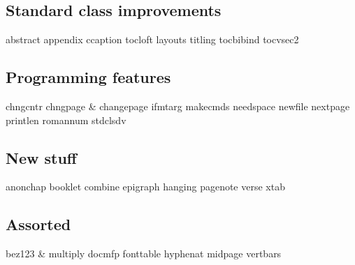 \documentclass{ltugboat}
\begin{document}
\subsection{Standard class improvements}

 abstract
 appendix
 ccaption
 tocloft
 layouts
 titling
 tocbibind
 tocvsec2

\subsection{Programming features}

 chngcntr
 chngpage \& changepage
 ifmtarg
 makecmds
 needspace
 newfile
 nextpage
 printlen
 romannum
 stdclsdv

\subsection{New stuff}

 anonchap
 booklet
 combine
 epigraph
 hanging
 pagenote
 verse
 xtab
 
\subsection{Assorted}

 bez123 \& multiply
 docmfp
 fonttable
 hyphenat
 midpage
 vertbars
\end{document}
